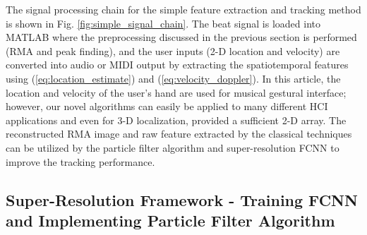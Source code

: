 \documentclass[10pt,journal,final]{IEEEtran}
\begin{document}

The signal processing chain for the simple feature extraction and tracking method is shown in Fig. \ref{fig:simple_signal_chain}. 
The beat signal is loaded into MATLAB where the preprocessing discussed in the previous section is performed (RMA and peak finding), and the user inputs (2-D location and velocity) are converted into audio or MIDI output by extracting the spatiotemporal features using (\ref{eq:location_estimate}) and (\ref{eq:velocity_doppler}).
In this article, the location and velocity of the user's hand are used for musical gestural interface; however, our novel algorithms can easily be applied to many different HCI applications and even for 3-D localization, provided a sufficient 2-D array.
The reconstructed RMA image and raw feature extracted by the classical techniques can be utilized by the particle filter algorithm and super-resolution FCNN to improve the tracking performance.

\subsection{Super-Resolution Framework - Training FCNN and Implementing Particle Filter Algorithm}
\label{subsec:enhanced_tracking_implementation}
\end{document}
